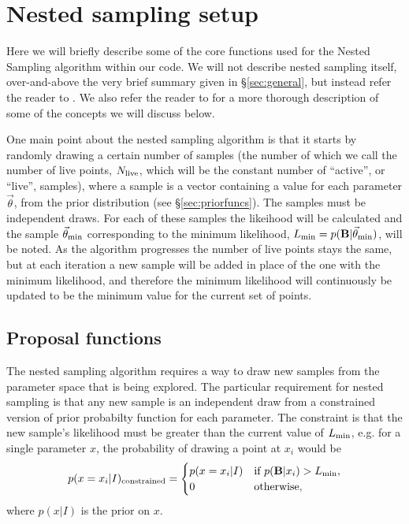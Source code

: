 \section{Nested sampling setup}

Here we will briefly describe some of the core functions used for the Nested Sampling algorithm within our code. We will
not describe nested sampling itself, over-and-above the very brief summary given in \S\ref{sec:general}, but instead refer
the reader to \citet{Veitch:2010}. We also refer the reader to \citet{2015PhRvD..91d2003V} for a more thorough description
of some of the concepts we will discuss below.

One main point about the nested sampling algorithm is that it starts by randomly drawing a certain number of samples (the number of
which we call the number of live points, $N_{\rm live}$, which will be the constant number of ``active'', or ``live'', samples),  
where a sample is a vector containing a value for each parameter $\vec{\theta}$, from the prior distribution (see \S\ref{sec:priorfuncs}).
The samples must be independent draws. For each of these samples the likeihood will be calculated and the sample $\vec{\theta}_{\rm min}$
corresponding to the minimum likelihood, $L_{\rm min} = p(\mathbf{B}|\vec{\theta}_{\rm min})$, will be noted. As the algorithm
progresses the number of live points stays the
same, but at each iteration a new sample will be added in place of the one with the minimum likelihood, and therefore the
minimum likelihood will continuously be updated to be the minimum value for the current set of points.

\subsection{Proposal functions}\label{sec:proposals}

The nested sampling algorithm requires a way to draw new samples from the parameter space that is being explored. The
particular requirement for nested sampling is that any new sample is an independent draw from a constrained version
of prior probabilty function for each parameter. The constraint is that the new sample's likelihood must be greater
than the current value of $L_{\rm min}$, e.g. for a single parameter $x$, the probability of drawing a point at $x_i$ 
would be
\begin{equation}
 p(x=x_i|I)_{\rm constrained} = \begin{cases}
             p(x=x_i|I) & \text{if~} p(\mathbf{B}|x_i) > L_{\rm min}, \\
             0 & \text{otherwise},
            \end{cases}
\end{equation}
where $p(x|I)$ is the prior on $x$.


